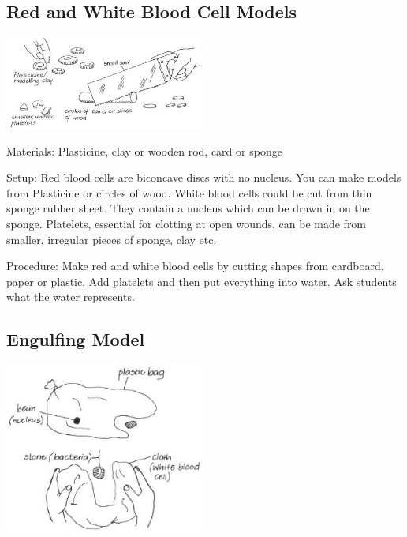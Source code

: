 \begin{multicols}{2}
\columnbreak

\subsection{Red and White Blood Cell Models} %

\begin{center}
\includegraphics[width=0.49\textwidth]{./img/vso/red-white-model.jpg}
\end{center}

\begin{description*}
\item[Materials:]{Plasticine, clay or wooden rod, card or sponge}
\item[Setup:]{Red blood cells are biconcave discs with no nucleus. You can make
models from Plasticine or circles of wood. White blood cells could be
cut from thin sponge rubber sheet. They contain a nucleus which can
be drawn in on the sponge. Platelets, essential for clotting at open
wounds, can be made from smaller, irregular pieces of sponge, clay etc. }
\item[Procedure:]{Make red and white blood cells
by cutting shapes from cardboard,
paper or plastic.
Add platelets and then put
everything into water. Ask
students what the water
represents.}
\end{description*}

\subsection{Engulfing Model} %

\begin{center}
\includegraphics[width=0.49\textwidth]{./img/vso/engulfing.jpg}
\end{center}


\end{multicols}

